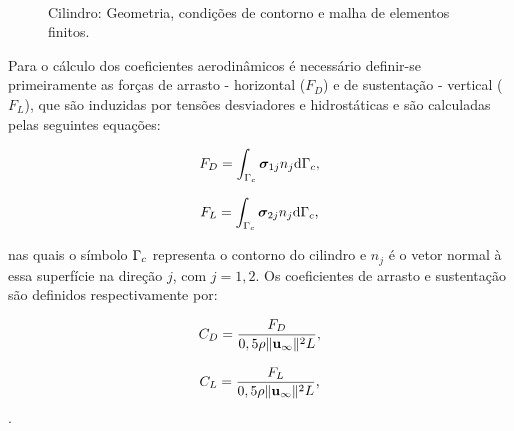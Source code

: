 \documentclass[tese_patricia]{subfiles}%
\begin{document}
\begin{figure}[!htb]
	\centering
	\\
	\caption{Cilindro: Geometria, condições de contorno e malha de elementos finitos.}
\end{figure}

Para o cálculo dos coeficientes aerodinâmicos é necessário definir-se primeiramente as forças de arrasto - horizontal ($F_D$) e de sustentação - vertical ($F_L$), que são induzidas por tensões desviadores e hidrostáticas e são calculadas pelas seguintes equações:

\begin{align}
F_D = \int_{\Gamma_{c}} \boldsymbol{\sigma}_{1j}n_{j} \mathrm{d}\Gamma_{c},
\end{align}

\begin{align}
F_L = \int_{\Gamma_{c}} \boldsymbol{\sigma}_{2j}n_{j} \mathrm{d}\Gamma_{c},
\end{align}

\noindent nas quais o símbolo $\Gamma_{c}$ representa o contorno do cilindro e $n_j$ é o vetor normal à essa superfície na direção $j$, com $j=1,2$. Os coeficientes de arrasto e sustentação são definidos respectivamente por:

\begin{align}
	C_D = \frac{F_D}{0,5\rho \lVert \mathbf{u}_{\infty} \lVert^{2} L},
\end{align}

\begin{align}
	C_L = \frac{F_L}{0,5\rho \lVert \mathbf{u}_{\infty} \lVert^{2} L},
\end{align}.
\end{document}
